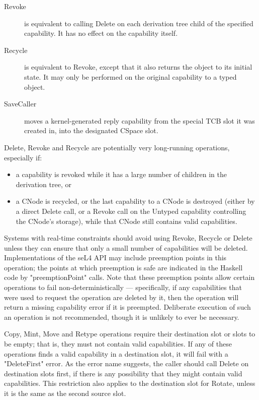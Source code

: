 \begin{description}
\item[Revoke] is equivalent to calling Delete on each derivation tree
child of the specified capability. It has no effect on the capability itself.

\item[Recycle] is equivalent to Revoke, except that it also returns the object to its initial state. It may only be performed on the original capability to a typed object.

\item[SaveCaller] moves a kernel-generated reply capability from the special TCB slot it was created in, into the designated CSpace slot.
\end{description}

Delete, Revoke and Recycle are potentially very long-running operations, especially if:
\begin{itemize}
\item a capability is revoked while it has a large number of children in the
derivation tree, or
\item a CNode is recycled, or the last capability to a CNode is destroyed (either by a direct Delete call, or a Revoke call on the Untyped capability controlling the CNode's storage), while that CNode still contains valid capabilities.
\end{itemize}

Systems with real-time constraints should avoid using Revoke, Recycle or Delete unless
they can ensure that only a small number of capabilities will be deleted.
Implementations of the seL4 API may include preemption points in this operation; the points at which preemption is safe are indicated in the Haskell code by "preemptionPoint" calls. Note that these preemption points allow certain operations to fail non-deterministically --- specifically, if any capabilities that were used to request the operation are deleted by it, then the operation will return a missing capability error if it is preempted. Deliberate execution of such an operation is not recommended, though it is unlikely to ever be necessary.

Copy, Mint, Move and Retype operations require their destination slot
or slots to be empty; that is, they must not contain valid capabilities. If any
of these operations finds a valid capability in a destination slot, it will
fail with a "DeleteFirst" error. As the error name suggests, the caller should
call Delete on destination slots first, if there is any possibility that they
might contain valid capabilities. This restriction also applies to the destination slot for Rotate, unless it is the same as the second source slot.


